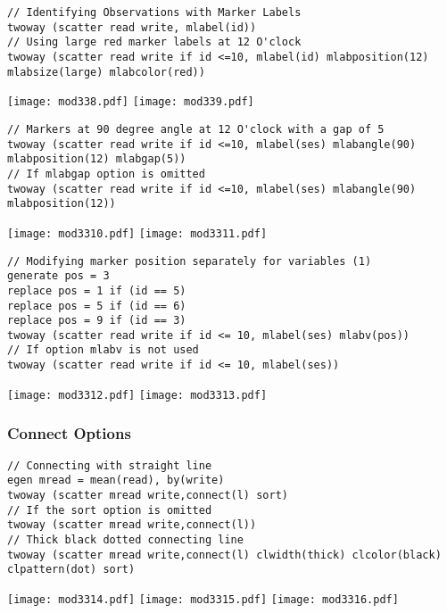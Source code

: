 \begin{lstlisting}
// Identifying Observations with Marker Labels
twoway (scatter read write, mlabel(id))
// Using large red marker labels at 12 O'clock
twoway (scatter read write if id <=10, mlabel(id) mlabposition(12) mlabsize(large) mlabcolor(red))
\end{lstlisting}
\begin{center}
\texttt{[image: mod338.pdf]}
\texttt{[image: mod339.pdf]}
\end{center}

\begin{lstlisting}
// Markers at 90 degree angle at 12 O'clock with a gap of 5
twoway (scatter read write if id <=10, mlabel(ses) mlabangle(90) mlabposition(12) mlabgap(5))
// If mlabgap option is omitted
twoway (scatter read write if id <=10, mlabel(ses) mlabangle(90) mlabposition(12))
\end{lstlisting}
\begin{center}
\texttt{[image: mod3310.pdf]}
\texttt{[image: mod3311.pdf]}
\end{center}


\begin{lstlisting}
// Modifying marker position separately for variables (1)
generate pos = 3
replace pos = 1 if (id == 5)
replace pos = 5 if (id == 6)
replace pos = 9 if (id == 3)
twoway (scatter read write if id <= 10, mlabel(ses) mlabv(pos))
// If option mlabv is not used
twoway (scatter read write if id <= 10, mlabel(ses))
\end{lstlisting}
\begin{center}
\texttt{[image: mod3312.pdf]}
\texttt{[image: mod3313.pdf]}
\end{center}

\subsubsection{Connect Options}

\begin{lstlisting}
// Connecting with straight line
egen mread = mean(read), by(write)
twoway (scatter mread write,connect(l) sort)
// If the sort option is omitted
twoway (scatter mread write,connect(l))
// Thick black dotted connecting line
twoway (scatter mread write,connect(l) clwidth(thick) clcolor(black) clpattern(dot) sort)
\end{lstlisting}
\begin{center}
\texttt{[image: mod3314.pdf]}
\texttt{[image: mod3315.pdf]}
\texttt{[image: mod3316.pdf]}
\end{center}


